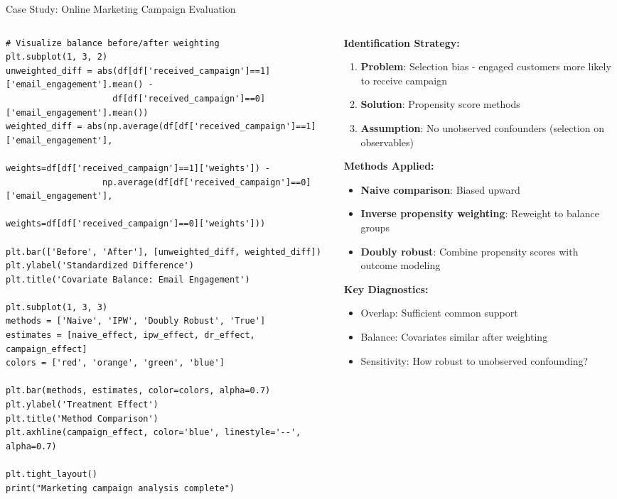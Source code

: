 \documentclass[aspectratio=169,11pt]{beamer}
\begin{document}
\begin{frame}[fragile]{Case Study: Online Marketing Campaign Evaluation}
\begin{columns}
\begin{column}{0.55\textwidth}
\begin{lstlisting}[basicstyle=\ttfamily\tiny]
# Visualize balance before/after weighting
plt.subplot(1, 3, 2)
unweighted_diff = abs(df[df['received_campaign']==1]['email_engagement'].mean() - 
                     df[df['received_campaign']==0]['email_engagement'].mean())
weighted_diff = abs(np.average(df[df['received_campaign']==1]['email_engagement'], 
                              weights=df[df['received_campaign']==1]['weights']) -
                   np.average(df[df['received_campaign']==0]['email_engagement'], 
                              weights=df[df['received_campaign']==0]['weights']))

plt.bar(['Before', 'After'], [unweighted_diff, weighted_diff])
plt.ylabel('Standardized Difference')
plt.title('Covariate Balance: Email Engagement')

plt.subplot(1, 3, 3)
methods = ['Naive', 'IPW', 'Doubly Robust', 'True']
estimates = [naive_effect, ipw_effect, dr_effect, campaign_effect]
colors = ['red', 'orange', 'green', 'blue']

plt.bar(methods, estimates, color=colors, alpha=0.7)
plt.ylabel('Treatment Effect')
plt.title('Method Comparison')
plt.axhline(campaign_effect, color='blue', linestyle='--', alpha=0.7)

plt.tight_layout()
print("Marketing campaign analysis complete")
\end{lstlisting}
\end{column}
\begin{column}{0.45\textwidth}
\textbf{Identification Strategy:}
\begin{enumerate}
\item \textbf{Problem}: Selection bias - engaged customers more likely to receive campaign
\item \textbf{Solution}: Propensity score methods
\item \textbf{Assumption}: No unobserved confounders (selection on observables)
\end{enumerate}

\vspace{0.3cm}
\textbf{Methods Applied:}
\begin{itemize}
\item \textbf{Naive comparison}: Biased upward
\item \textbf{Inverse propensity weighting}: Reweight to balance groups
\item \textbf{Doubly robust}: Combine propensity scores with outcome modeling
\end{itemize}

\vspace{0.3cm}
\textbf{Key Diagnostics:}
\begin{itemize}
\item \textcolor{forest}{Overlap}: Sufficient common support
\item \textcolor{forest}{Balance}: Covariates similar after weighting
\item \textcolor{forest}{Sensitivity}: How robust to unobserved confounding?
\end{itemize}


\end{column}
\end{columns}
\end{frame}
\end{document}
